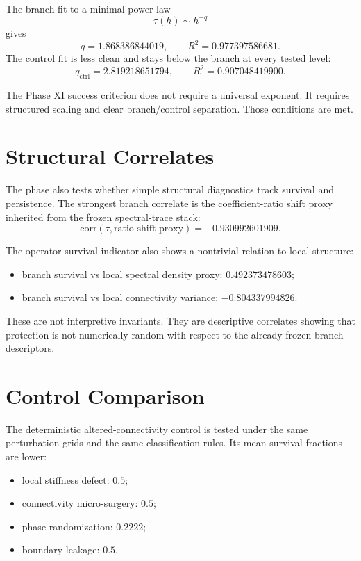 \documentclass[11pt]{article}
\begin{document}
The branch fit to a minimal power law
\[
\tau(h) \sim h^{-q}
\]
gives
\[
q = 1.868386844019,
\qquad
R^2 = 0.977397586681.
\]
The control fit is less clean and stays below the branch at every tested level:
\[
q_{\mathrm{ctrl}} = 2.819218651794,
\qquad
R^2 = 0.907048419900.
\]

The Phase XI success criterion does not require a universal exponent. It requires structured scaling and clear branch/control separation. Those conditions are met.

\section{Structural Correlates}

The phase also tests whether simple structural diagnostics track survival and persistence. The strongest branch correlate is the coefficient-ratio shift proxy inherited from the frozen spectral-trace stack:
\[
\mathrm{corr}(\tau,\text{ratio-shift proxy}) = -0.930992601909.
\]

The operator-survival indicator also shows a nontrivial relation to local structure:
\begin{itemize}
\item branch survival vs local spectral density proxy: $0.492373478603$;
\item branch survival vs local connectivity variance: $-0.804337994826$.
\end{itemize}

These are not interpretive invariants. They are descriptive correlates showing that protection is not numerically random with respect to the already frozen branch descriptors.

\section{Control Comparison}

The deterministic altered-connectivity control is tested under the same perturbation grids and the same classification rules. Its mean survival fractions are lower:
\begin{itemize}
\item local stiffness defect: $0.5$;
\item connectivity micro-surgery: $0.5$;
\item phase randomization: $0.2222$;
\item boundary leakage: $0.5$.
\end{itemize}
\end{document}
